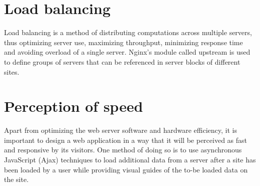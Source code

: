 \section{Load balancing}

Load balancing is a method of distributing computations across multiple servers, thus optimizing server use, maximizing throughput, minimizing response time and avoiding overload of a single server. Nginx's module called upstream \cite{Nginx:Upstream} is used to define groups of servers that can be referenced in server blocks of different sites. 

\section{Perception of speed}

Apart from optimizing the web server software and hardware efficiency, it is important to design a web application in a way that it will be perceived as fast and responsive by its visitors. One method of doing so is to use asynchronous JavaScript (Ajax) techniques to load additional data from a server after a site has been loaded by a user while providing visual guides of the to-be loaded data on the site. 


